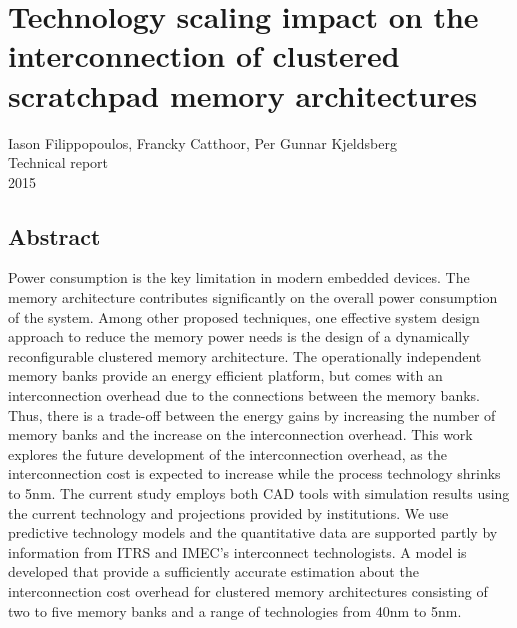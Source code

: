 
%


\chapter{Technology scaling impact on the interconnection of clustered scratchpad memory architectures}
\label{interconnection}

\begin{center}
Iason Filippopoulos, Francky Catthoor, Per Gunnar Kjeldsberg
\\
Technical report
\\
2015
\end{center}
\afterpage{\null\newpage}
\newpage

\vspace*{\fill}
\section*{\hspace*{\fill} Abstract \hspace*{\fill}}
Power consumption is the key limitation in modern embedded devices.
The memory architecture contributes significantly on the overall power consumption of the system.
Among other proposed techniques, one effective system design approach to reduce the memory power needs is the design of a dynamically reconfigurable clustered memory architecture.
The operationally independent memory banks provide an energy efficient platform, but comes with an interconnection overhead due to the connections between the memory banks. 
Thus, there is a trade-off between the energy gains by increasing the number of memory banks and the increase on the interconnection overhead.
This work explores the future development of the interconnection overhead, as the interconnection cost is expected to increase while the process technology shrinks to 5nm.
The current study employs both CAD  tools with simulation results using the current technology and projections provided by institutions.
We use predictive technology models and the quantitative data are supported partly by information
from ITRS and IMEC's interconnect technologists.
A model is developed that provide a sufficiently accurate estimation about the interconnection cost overhead for clustered memory architectures consisting of two to five memory banks and a range of technologies from 40nm to 5nm.  
\vspace*{\fill}
\afterpage{\null\newpage}
\newpage

